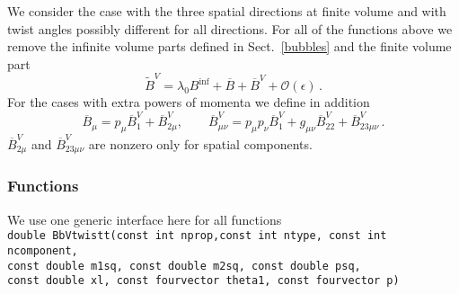 \documentclass[12pt,a4paper]{article}
\newcommand{\mytt}[1]{\texttt{#1}}
\newcommand{\newfunction}[1]{\mytt{#1}\index{\mytt{#1}}}
\begin{document}
We consider the case with the three spatial directions at finite volume
and with twist angles possibly different for all directions.
For all of the functions above we remove the infinite volume parts
defined in Sect.~\ref{bubbles} and the finite volume part
\begin{equation}
\tilde B^V = 
\lambda_0 B^\mathrm{inf} + \overline B + \overline B^V+\mathcal{O}(\epsilon)\,.
\end{equation}
For the cases with extra powers of momenta we define in addition
\begin{equation}
\label{defFVbubbletwistcomp}
\overline B_\mu = p_\mu \overline B^V_1+\overline B^V_{2\mu},\qquad
\overline B^V_{\mu\nu} = p_\mu p_\nu \overline B^V_1
+g_{\mu\nu}\overline B^V_{22}+\overline B^V_{23\mu\nu}\,.
\end{equation}
$\overline B^V_{2\mu}$ and $\overline B^V_{23\mu\nu}$ are nonzero only
for spatial components.

\subsubsection{Functions}

We use one generic interface here for all functions\\
\mytt{double \newfunction{BbVtwistt}(const int nprop,const int ntype,
const int ncomponent,\\
\hspace*{2cm} const double m1sq, const double m2sq, const double psq,\\
\hspace*{2cm} const double xl,
const fourvector theta1, const fourvector p)}
\end{document}
